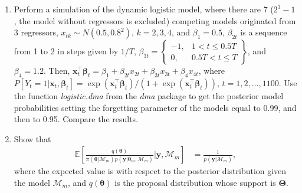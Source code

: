 \begin{enumerate}
\item Perform a simulation of the dynamic logistic model, where there are 7 ($2^3-1$, the model without regressors is excluded) competing models originated from 3 regressors, $x_{tk}\sim N(0.5,0.8^2)$, $k=2,3,4$, and $\beta_1=0.5$, $\beta_{2t}$ is a sequence from 1 to 2 in steps given by $1/T$, $\beta_{3t}=\begin{Bmatrix}
	-1, & 1<t\leq 0.5T\\
	0, & 0.5T< t \leq T
\end{Bmatrix}$, and $\beta_4=1.2$. Then, $\bm{x}_t^{\top}\bm{\beta}_t=\beta_1+\beta_{2t}x_{2t}+\beta_{3t}x_{3t}+\beta_{4}x_{4t}$, where $P[Y_t=1|\bm{x}_t,\bm{\beta}_t]=\exp(\bm{x}_t^{\top}\bm{\beta}_t)/(1+\exp(\bm{x}_t^{\top}\bm{\beta}_t))$, $t=1,2,\dots,1100$. Use the function \textit{logistic.dma} from the \textit{dma} package to get the posterior model probabilities setting the forgetting parameter of the models equal to 0.99, and then to 0.95. Compare the results.

\item Show that 
\begin{align*}
	\mathbb{E}\left[\frac{q(\bm{\theta})}{\pi(\bm{\theta}|\mathcal{M}_m)p(\bm{y}|\bm{\theta}_m,\mathcal{M}_m)}\biggr\rvert \bm{y},\mathcal{M}_m\right]&=\frac{1}{p(\bm{y}|\mathcal{M}_m)},
\end{align*}
where the expected value is with respect to the posterior distribution given the model $\mathcal{M}_m$, and $q(\bm{\theta})$ is the proposal distribution whose support is $\bm{\Theta}$.        
	
\end{enumerate}